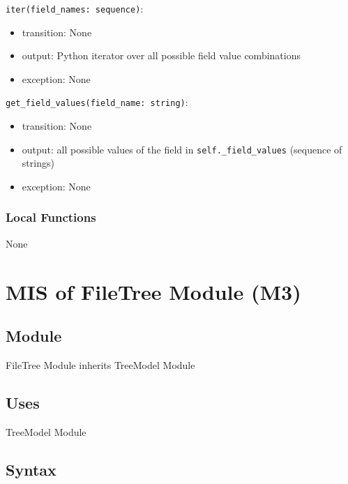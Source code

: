 \documentclass[12pt, titlepage]{article}
\begin{document}
\noindent \lstinline|iter(field_names: sequence)|:
\begin{itemize}
    \item transition: None
    \item output: Python iterator over all possible field value combinations
    \item exception: None
\end{itemize}


\noindent \lstinline|get_field_values(field_name: string)|:
\begin{itemize}
    \item transition: None
    \item output: all possible values of the field in \lstinline|self._field_values| (sequence of strings)
    \item exception: None
\end{itemize}




\subsubsection{Local Functions}


None


\newpage








\section{MIS of FileTree Module (M3)}




\subsection{Module}


FileTree Module inherits TreeModel Module




\subsection{Uses}


TreeModel Module




\subsection{Syntax}
\end{document}
